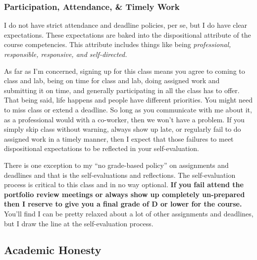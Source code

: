 \documentclass[10pt]{article}
\begin{document}
\subsubsection{Participation, Attendance, \& Timely Work}

I do not have strict attendance and deadline policies, per se, but I do have clear expectations. These
expectations are baked into the dispositional attribute of the course competencies. This attribute
includes things like being \textit{professional, responsible, responsive, and self-directed.}

As far as I'm concerned, signing up for this class means you agree to coming to class and lab,
being on time for class and lab, doing assigned work and submitting it on time, and generally participating
in all the class has to offer.  That being said, life happens and people have different priorities.
You might need to miss class or extend a deadline.  So long as you communicate with me about it, as a
professional would with a co-worker, then we won't have a problem. If you simply skip class without
warning, always show up late, or regularly fail to do assigned work in a timely manner, then I expect that
those failures to meet dispositional expectations to be reflected in your self-evaluation.

There is one exception to my ``no grade-based policy'' on assignments and deadlines and that is the
self-evaluations and reflections. The self-evaluation process is critical to this class and in no way
optional. \textbf{If you fail attend the portfolio review meetings or always show up completely un-prepared
then I reserve to give you a final grade of D or lower for the course.} You'll find I can be pretty relaxed
about a lot of other assignments and deadlines, but I draw the line at the self-evaluation process.


\subsection{Academic Honesty}
\end{document}
